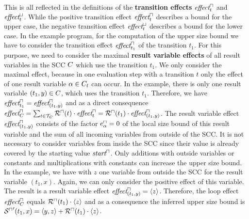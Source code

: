 \begin{example}
  This is all reflected in the definitions of the \textbf{transition effects} $\emph{effect}^\sqcap_t$ and $\emph{effect}^\sqcup_t$.
  While the positive transition effect $\emph{effect}^\sqcap_t$ describes a bound for the upper case, the negative transition effect $\emph{effect}^\sqcup_t$ describes a bound for the lower case.
  In the example program, for the computation of the upper size bound we have to consider the transition effect $\emph{effect}^\sqcap_{t_1}$ of the transition $t_1$.
  For this purpose, we need to consider the maximal \textbf{result variable effects} of all result variables in the SCC $C$ which use the transition $t_1$.
  We only consider the maximal effect, because in one evaluation step with a transition $t$ only the effect of one result variable $\alpha \in C_t$ can occur.
  In the example, there is only one result variable $(t_1,y) \in C$, which uses the transition $t_1$.
  Therefore, we have $\emph{effect}^\sqcap_{t_1} = \emph{effect}^\sqcap_{(t_1,y)}$ and as a direct consequence $\emph{effect}^\sqcap_C = \sum_{t \in \mathcal{T}_C} {\mathcal{R}^\sqcap}(t) \cdot \emph{effect}^\sqcap_{t} = {\mathcal{R}^\sqcap}(t_1) \cdot \emph{effect}^\sqcap_{(t_1,y)}$.
  The result variable effect $\emph{effect}^\sqcap_{(t_1,y)}$ consists of the factor $e^\sqcap_\alpha = 0$ of the local size bound of this result variable and the sum of all incoming variables from outside of the SCC.
  It is not necessary to consider variables from inside the SCC since their value is already covered by the starting value $\emph{start}^\sqcap$.
  Only additions with outside variables or constants and multiplications with constants can increase the upper size bound.
  In the example, we have with $z$ one variable from outside the SCC for the result variable $(t_1,x)$.
  Again, we can only consider the positive effect of this variable.
  The result is a result variable effect $\emph{effect}^\sqcap_{(t_1,y)} = \langle z\rangle$.
  Therefore, the loop effect $\emph{effect}^\sqcap_C$ equals ${\mathcal{R}^\sqcap}(t_1) \cdot \langle z\rangle$ and as a consequence the inferred upper size bound is ${\mathcal{S}^\sqcap}'(t_1,x) = \langle y,z\rangle + {\mathcal{R}^\sqcap}(t_1) \cdot \langle z\rangle$.
\end{example}
